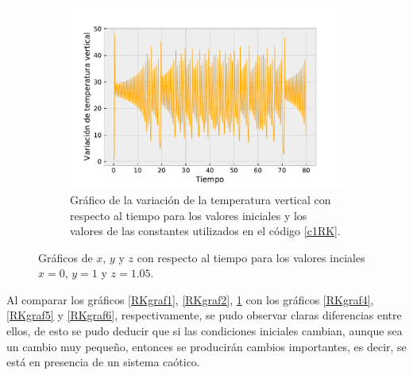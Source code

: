 \documentclass[../portafolio.tex]{subfiles}
\begin{document}
\begin{figure}[h]
    \hfill
    \begin{subfigure}[b]{0.3\textwidth}
         \centering
         \includegraphics[width=\textwidth]{tex/img/ej2_RK_graf2.pdf}
         \caption{Gráfico de la variación de la temperatura vertical con respecto al tiempo para los valores iniciales y los valores de las constantes utilizados en el código \ref{c1RK}. }
         \label{RKgraf3}
     \end{subfigure}
    \caption{Gráficos de $x$, $y$ y $z$ con respecto al tiempo para los valores inciales $x=0$, $y=1$ y $z=1.05$.}
    \label{RK_graf_ej2}
\end{figure}

Al comparar los gráficos \ref{RKgraf1}, \ref{RKgraf2}, \ref{RKgraf3} con los gráficos \ref{RKgraf4}, \ref{RKgraf5} y \ref{RKgraf6}, respectivamente, se pudo observar claras diferencias entre ellos, de esto se pudo deducir que si las condiciones iniciales cambian, aunque sea un cambio muy pequeño, entonces se producirán cambios importantes, es decir, se está en presencia de un sistema caótico.
\end{document}
